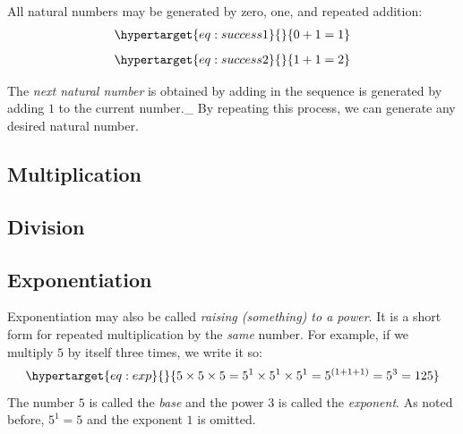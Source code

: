\documentclass[
  a4paper,
]{article}
\begin{document}
All natural numbers may be generated by zero, one, and repeated
addition: \begin{equation}\protect\hypertarget{eq:success1}{}{
\begin{aligned}
0 + 1 = 1
\end{aligned}
}\label{eq:success1}\end{equation}
\begin{equation}\protect\hypertarget{eq:success2}{}{
\begin{aligned}
1 + 1 = 2
\end{aligned}
}\label{eq:success2}\end{equation}

The \emph{next natural number} is obtained by adding in the sequence is
generated by adding \(1\) to the current number.\_ By repeating this
process, we can generate any desired natural number.

\hypertarget{multiplication-1}{%
\subsection{Multiplication}\label{multiplication-1}}

\hypertarget{division}{%
\subsection{Division}\label{division}}

\hypertarget{exponentiation}{%
\subsection{Exponentiation}\label{exponentiation}}

Exponentiation may also be called \emph{raising (something) to a power}.
It is a short form for repeated multiplication by the \emph{same}
number. For example, if we multiply \(5\) by itself three times, we
write it so: \begin{equation}\protect\hypertarget{eq:exp}{}{
5\times5\times5 = 5^1\times5^1\times5^1 = 5^{(1+1+1)} = 5^{3} = 125
}\label{eq:exp}\end{equation} The number \(5\) is called the \emph{base}
and the power \(3\) is called the \emph{exponent}. As noted before,
\(5^1 = 5\) and the exponent \(1\) is omitted.
\end{document}
